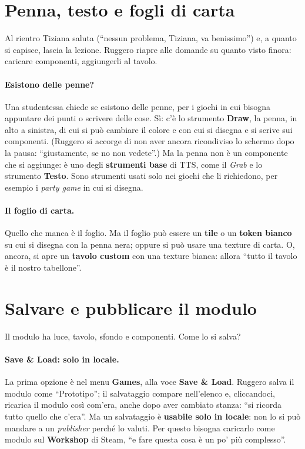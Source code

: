 \section{Penna, testo e fogli di carta}
\label{a8:sec:penna}

Al rientro Tiziana saluta (``nessun problema, Tiziana, va benissimo'') e, a quanto
si capisce, lascia la lezione. Ruggero riapre alle domande su quanto visto finora:
caricare componenti, aggiungerli al tavolo.

\paragraph{Esistono delle penne?} Una studentessa chiede se esistono delle penne, per i
giochi in cui bisogna appuntare dei punti o scrivere delle cose. Sì: c'è lo strumento
\textbf{Draw}, la penna, in alto a sinistra, di cui si può cambiare il colore e con cui
si disegna e si scrive sui componenti. (Ruggero si accorge di non aver ancora
ricondiviso lo schermo dopo la pausa: ``giustamente, se no non vedete''.) Ma la penna
non è un componente che si aggiunge: è uno degli \textbf{strumenti base} di TTS, come
il \emph{Grab} e lo strumento \textbf{Testo}. Sono strumenti usati solo nei giochi che
li richiedono, per esempio i \emph{party game} in cui si disegna.

\paragraph{Il foglio di carta.} Quello che manca è il foglio. Ma il foglio può essere
un \textbf{tile} o un \textbf{token bianco} su cui si disegna con la penna nera; oppure
si può usare una texture di carta. O, ancora, si apre un \textbf{tavolo custom} con una
texture bianca: allora ``tutto il tavolo è il nostro tabellone''.

\section{Salvare e pubblicare il modulo}
\label{a8:sec:workshop}

Il modulo ha luce, tavolo, sfondo e componenti. Come lo si salva?

\paragraph{Save \& Load: solo in locale.} La prima opzione è nel menu \textbf{Games},
alla voce \textbf{Save \& Load}. Ruggero salva il modulo come ``Prototipo''; il
salvataggio compare nell'elenco e, cliccandoci, ricarica il modulo così com'era, anche
dopo aver cambiato stanza: ``si ricorda tutto quello che c'era''. Ma un salvataggio è
\textbf{usabile solo in locale}: non lo si può mandare a un \emph{publisher} perché lo
valuti. Per questo bisogna caricarlo come modulo sul \textbf{Workshop} di Steam, ``e
fare questa cosa è un po' più complesso''.

